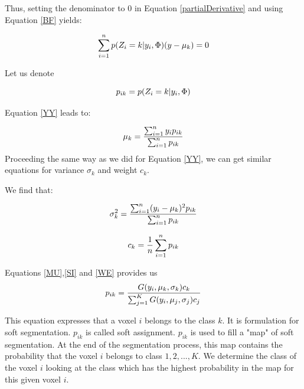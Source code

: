 Thus, setting the denominator to 0 in Equation \ref{partialDerivative} and using Equation \ref{BF} yields:
 
  \begin{equation}\label{YY}
  \sum_{i=1}^n p(Z_i=k|y_i,\Phi)(y-\mu_k)=0\\
  \end{equation}

Let us denote

  \begin{equation}%
  p_{ik}=p(Z_i=k|y_i,\Phi)\\
  \end{equation}

Equation \ref{YY} leads to:
 
  \begin{equation}\label{MU}
  \mu_k = \frac{\sum_{i=1}^n y_ip_{ik}}{\sum_{i=1}^n p_{ik}}\\
  \end{equation}
Proceeding the same way as we did for Equation \ref{YY}, we can get similar equations for variance $\sigma_k$ and weight $c_k$. 

We find that:

  \begin{equation}\label{SI}
  \sigma_k^2 = \frac{\sum_{i=1}^n (y_i-\mu_k)^2p_{ik}}{\sum_{i=1}^n p_{ik}}\\
  \end{equation}
  
  \begin{equation}\label{WE}
  c_k = \frac{1}{n}\sum_{i=1}^n p_{ik}\\
  \end{equation}

\par
Equations \ref{MU},\ref{SI} and \ref{WE} provides us
  \begin{equation}\label{SS}
  p_{ik}= \frac{G(y_i,\mu_k,\sigma_k)c_k}{\sum_{j=1}^K G(y_i,\mu_j,\sigma_j)c_j}\\
  \end{equation}


This equation expresses that a voxel $i$ belongs to the class $k$. It is formulation for soft segmentation. $p_{ik}$ is called soft assignment.
$p_{ik}$ is used to fill a "map" of soft segmentation. At the end of the segmentation process, this map contains the probability that the voxel $i$ belongs to class $1, 2, ..., K$. We determine the class of the voxel $i$ looking at the class which has the highest probability in the map for this given voxel $i$.
  
